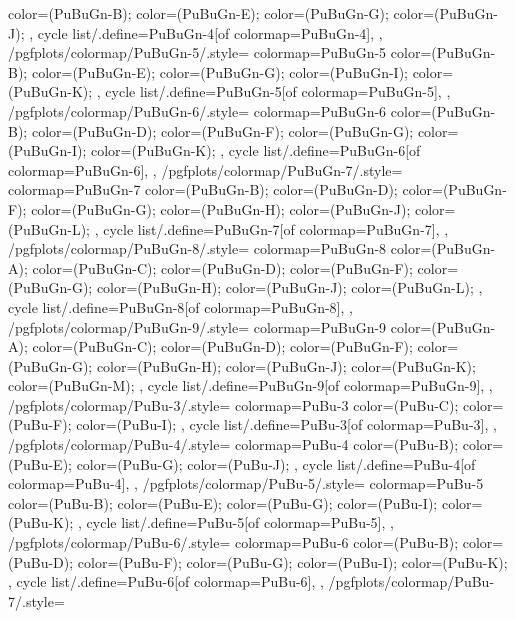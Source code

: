 {{{      color=(PuBuGn-B);
      color=(PuBuGn-E);
      color=(PuBuGn-G);
      color=(PuBuGn-J);
    },
    cycle list/.define={PuBuGn-4}{[of colormap=PuBuGn-4]},
  },
  /pgfplots/colormap/PuBuGn-5/.style={
    colormap={PuBuGn-5}{
      color=(PuBuGn-B);
      color=(PuBuGn-E);
      color=(PuBuGn-G);
      color=(PuBuGn-I);
      color=(PuBuGn-K);
    },
    cycle list/.define={PuBuGn-5}{[of colormap=PuBuGn-5]},
  },
  /pgfplots/colormap/PuBuGn-6/.style={
    colormap={PuBuGn-6}{
      color=(PuBuGn-B);
      color=(PuBuGn-D);
      color=(PuBuGn-F);
      color=(PuBuGn-G);
      color=(PuBuGn-I);
      color=(PuBuGn-K);
    },
    cycle list/.define={PuBuGn-6}{[of colormap=PuBuGn-6]},
  },
  /pgfplots/colormap/PuBuGn-7/.style={
    colormap={PuBuGn-7}{
      color=(PuBuGn-B);
      color=(PuBuGn-D);
      color=(PuBuGn-F);
      color=(PuBuGn-G);
      color=(PuBuGn-H);
      color=(PuBuGn-J);
      color=(PuBuGn-L);
    },
    cycle list/.define={PuBuGn-7}{[of colormap=PuBuGn-7]},
  },
  /pgfplots/colormap/PuBuGn-8/.style={
    colormap={PuBuGn-8}{
      color=(PuBuGn-A);
      color=(PuBuGn-C);
      color=(PuBuGn-D);
      color=(PuBuGn-F);
      color=(PuBuGn-G);
      color=(PuBuGn-H);
      color=(PuBuGn-J);
      color=(PuBuGn-L);
    },
    cycle list/.define={PuBuGn-8}{[of colormap=PuBuGn-8]},
  },
  /pgfplots/colormap/PuBuGn-9/.style={
    colormap={PuBuGn-9}{
      color=(PuBuGn-A);
      color=(PuBuGn-C);
      color=(PuBuGn-D);
      color=(PuBuGn-F);
      color=(PuBuGn-G);
      color=(PuBuGn-H);
      color=(PuBuGn-J);
      color=(PuBuGn-K);
      color=(PuBuGn-M);
    },
    cycle list/.define={PuBuGn-9}{[of colormap=PuBuGn-9]},
  },
  /pgfplots/colormap/PuBu-3/.style={
    colormap={PuBu-3}{
      color=(PuBu-C);
      color=(PuBu-F);
      color=(PuBu-I);
    },
    cycle list/.define={PuBu-3}{[of colormap=PuBu-3]},
  },
  /pgfplots/colormap/PuBu-4/.style={
    colormap={PuBu-4}{
      color=(PuBu-B);
      color=(PuBu-E);
      color=(PuBu-G);
      color=(PuBu-J);
    },
    cycle list/.define={PuBu-4}{[of colormap=PuBu-4]},
  },
  /pgfplots/colormap/PuBu-5/.style={
    colormap={PuBu-5}{
      color=(PuBu-B);
      color=(PuBu-E);
      color=(PuBu-G);
      color=(PuBu-I);
      color=(PuBu-K);
    },
    cycle list/.define={PuBu-5}{[of colormap=PuBu-5]},
  },
  /pgfplots/colormap/PuBu-6/.style={
    colormap={PuBu-6}{
      color=(PuBu-B);
      color=(PuBu-D);
      color=(PuBu-F);
      color=(PuBu-G);
      color=(PuBu-I);
      color=(PuBu-K);
    },
    cycle list/.define={PuBu-6}{[of colormap=PuBu-6]},
  },
  /pgfplots/colormap/PuBu-7/.style={
}}
